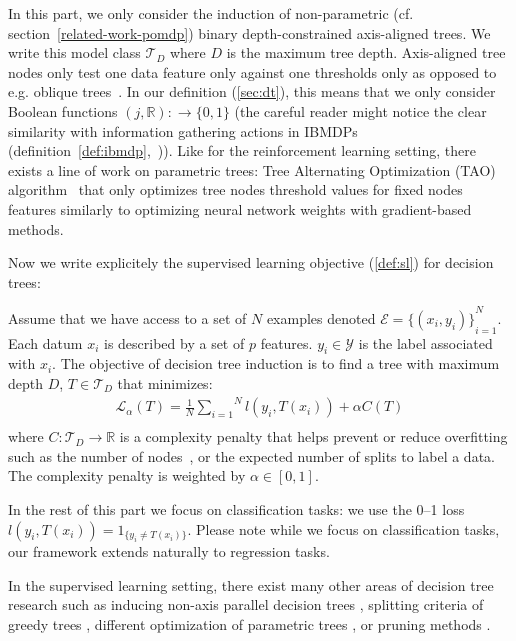 In this part, we only consider the induction of non-parametric (cf. section~\ref{related-work-pomdp}) binary depth-constrained axis-aligned trees. 
We write this model class $\mathcal{T}_D$ where $D$ is the maximum tree depth.
Axis-aligned tree nodes only test one data feature only against one thresholds only as opposed to e.g. oblique trees~\cite{murthy1994system}.
In our definition (\ref{sec:dt}), this means that we only consider Boolean functions $(j, \mathbb{R}):\rightarrow \{0, 1\}$ (the careful reader might notice the clear similarity with information gathering actions in IBMDPs (definition~\ref{def:ibmdp},~\cite{topin2021iterative})).
Like for the reinforcement learning setting, there exists a line of work on parametric trees: Tree Alternating Optimization (TAO) algorithm~\cite{NEURIPS2018_185c29dc,9534446,10.1145/3412815.3416882} that only optimizes tree nodes threshold values for fixed nodes features similarly to optimizing neural network weights with gradient-based methods. 

Now we write explicitely the supervised learning objective (\ref{def:sl}) for decision trees:

\begin{definition}\label{eq:suplearning}
    Assume that we have access to a set of $N$ examples denoted $\mathcal{E} = {\{(x_i, y_i)\}}_{i=1}^N$. Each datum $x_i$ is described by a set of $p$ features. $y_i \in {\mathcal Y}$ is the label associated with $x_i$. The objective of decision tree induction is to find a tree with maximum depth $D$, $T \in \mathcal{T}_D$ that minimizes:
    \begin{align*}
        {\mathcal L}_\alpha(T) = \frac{1}{N}\overset{N}{\underset{i=1}{\sum}}{l}(y_i, T(x_i)) + \alpha C(T) \\
\end{align*}
where $C: \mathcal{T}_D \rightarrow \mathbb{R}$ is a complexity penalty that helps prevent or reduce overfitting such as the number of nodes~\cite{breiman1984classification,quantbnb}, or the expected number of splits to label a data\cite{how-eff}. The complexity penalty is weighted by $\alpha \in [0, 1]$. %
\end{definition}

In the rest of this part we focus on classification tasks: we use the 0--1 loss $l(y_i, T(x_i)) = 1_{\{y_i\neq T(x_i)\}}$.
Please note while we focus on classification tasks, our framework extends naturally to regression tasks.

In the supervised learning setting, there exist many other areas of decision tree research \cite{loh2014fifty} such as inducing non-axis parallel decision trees \cite{murthy1994system,10.1145/3637528.3671903}, splitting criteria of greedy trees \cite{vanderlinden2024optimalgreedydecisiontrees}, different optimization of parametric trees \cite{NIPS2015_1579779b,10.5555/3327757.3327770}, or pruning methods \cite{pruning1,pruning2}. 